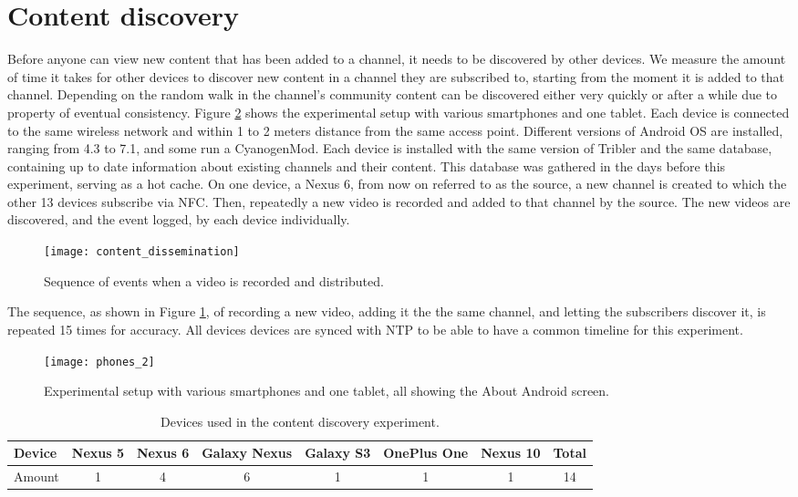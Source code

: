 \section{Content discovery}\label{sec:content_discovery}
Before anyone can view new content that has been added to a channel, it needs to be discovered by other devices.
We measure the amount of time it takes for other devices to discover new content in a channel they are subscribed to, starting from the moment it is added to that channel.
Depending on the random walk in the channel's community content can be discovered either very quickly or after a while due to property of eventual consistency.
Figure \ref{fig:phones_2} shows the experimental setup with various smartphones and one tablet.
Each device is connected to the same wireless network and within 1 to 2 meters distance from the same access point.
Different versions of Android OS are installed, ranging from 4.3 to 7.1, and some run a CyanogenMod.
Each device is installed with the same version of Tribler and the same database, containing up to date information about existing channels and their content.
This database was gathered in the days before this experiment, serving as a hot cache.
On one device, a Nexus 6, from now on referred to as the source, a new channel is created to which the other 13 devices subscribe via NFC.
Then, repeatedly a new video is recorded and added to that channel by the source.
The new videos are discovered, and the event logged, by each device individually.
\begin{figure}[H]
	\centering
	\texttt{[image: content\_dissemination]}
	\caption{Sequence of events when a video is recorded and distributed.}
	\label{fig:content_dissemination}
\end{figure}
The sequence, as shown in Figure \ref{fig:content_dissemination}, of recording a new video, adding it the the same channel, and letting the subscribers discover it, is repeated 15 times for accuracy.
All devices devices are synced with NTP to be able to have a common timeline for this experiment.
\begin{figure}[H]
	\centering
	\texttt{[image: phones\_2]}
	\caption{Experimental setup with various smartphones and one tablet, all showing the About Android screen.}
	\label{fig:phones_2}
\end{figure}
\begin{table}[H]
	\begin{tabular}{l | *{6}{c} || c} \hline
		Device & Nexus 5 & Nexus 6 & Galaxy Nexus & Galaxy S3 & OnePlus One & Nexus 10 & Total \\ \hline
		Amount & 1 & 4 & 6 & 1 & 1 & 1 & 14 \\ \hline
	\end{tabular}
	\caption{Devices used in the content discovery experiment.}
	\label{table:devices}
\end{table}
